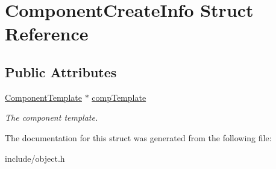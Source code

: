 \hypertarget{structComponentCreateInfo}{
\section{\-Component\-Create\-Info \-Struct \-Reference}
\label{dc/d1d/structComponentCreateInfo}
}
\subsection*{\-Public \-Attributes}
\begin{DoxyCompactItemize}
\item 
\hypertarget{structComponentCreateInfo_a59ec6bd690ff820f5fcf0c7ea0590e3e}{
\hyperlink{classComponentTemplate}{\-Component\-Template} $\ast$ \hyperlink{structComponentCreateInfo_a59ec6bd690ff820f5fcf0c7ea0590e3e}{comp\-Template}}
\label{dc/d1d/structComponentCreateInfo_a59ec6bd690ff820f5fcf0c7ea0590e3e}

\begin{DoxyCompactList}\small\item\em \-The component template. \end{DoxyCompactList}\end{DoxyCompactItemize}


\-The documentation for this struct was generated from the following file\-:\begin{DoxyCompactItemize}
\item 
include/object.\-h\end{DoxyCompactItemize}
